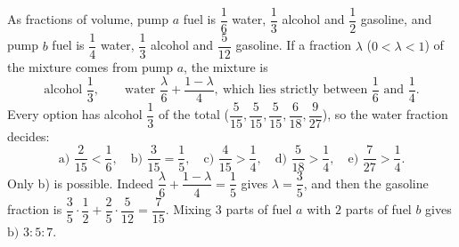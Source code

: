 As fractions of volume, pump $a$ fuel is $\dfrac{1}{6}$ water, $\dfrac{1}{3}$ alcohol and $\dfrac{1}{2}$ gasoline, and pump $b$ fuel is $\dfrac{1}{4}$ water, $\dfrac{1}{3}$ alcohol and $\dfrac{5}{12}$ gasoline. If a fraction $\lambda$ ($0<\lambda<1$) of the mixture comes from pump $a$, the mixture is
\[
\text{alcohol } \dfrac{1}{3},\qquad \text{water } \dfrac{\lambda}{6}+\dfrac{1-\lambda}{4},\ \text{which lies strictly between } \dfrac{1}{6} \text{ and } \dfrac{1}{4} .
\]
Every option has alcohol $\dfrac{1}{3}$ of the total ($\dfrac{5}{15},\dfrac{5}{15},\dfrac{5}{15},\dfrac{6}{18},\dfrac{9}{27}$), so the water fraction decides:
\[
\text{a) }\dfrac{2}{15}<\dfrac{1}{6},\quad \text{b) }\dfrac{3}{15}=\dfrac{1}{5},\quad \text{c) }\dfrac{4}{15}>\dfrac{1}{4},\quad \text{d) }\dfrac{5}{18}>\dfrac{1}{4},\quad \text{e) }\dfrac{7}{27}>\dfrac{1}{4} .
\]
Only b) is possible. Indeed $\dfrac{\lambda}{6}+\dfrac{1-\lambda}{4}=\dfrac{1}{5}$ gives $\lambda=\dfrac{3}{5}$, and then the gasoline fraction is $\dfrac{3}{5}\cdot\dfrac{1}{2}+\dfrac{2}{5}\cdot\dfrac{5}{12}=\dfrac{7}{15}$. Mixing $3$ parts of fuel $a$ with $2$ parts of fuel $b$ gives $\boxed{\text{b) } 3:5:7}$.
